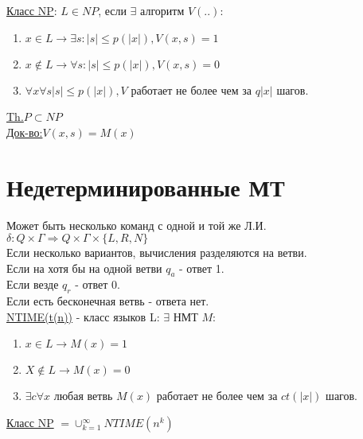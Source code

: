 \documentclass{article}
\begin{document}
	
	\underline{Класс NP}: $L\in NP$, если $\exists$ алгоритм $V(..):$
	\begin{enumerate}
		\item $x\in L \to \exists s:|s| \le p(|x|), V(x,s)=1$
		\item $x\not\in L \to \forall s:|s| \le p(|x|), V(x,s)=0$
		\item $\forall x \forall s |s| \le p(|x|), V$ работает не более чем за $q{|x|}$ шагов.
	\end{enumerate}
	\underline{Th.}$P \subset NP$\\
	\underline{Док-во:}$V(x,s)=M(x)$\\
	
	
	\section{Недетерминированные МТ}
	Может быть несколько команд с одной и той же Л.И.$\delta:Q\times\Gamma \Rightarrow Q\times\Gamma\times\{L,R,N\}$\\
	Если несколько вариантов, вычисления разделяются на ветви.\\
	Если на хотя бы на одной ветви $q_a$ - ответ 1.\\
	Если везде $q_r$ - ответ 0.\\
	Если есть бесконечная ветвь - ответа нет.\\
	
	\underline{NTIME(t(n))} - класс языков L: $\exists$ НМТ $M$:
	 \begin{enumerate}
	 	\item $x \in L \to M(x)=1$
		\item $X \not\in L \to M(x)=0$
		\item $\exists c \forall x$ любая ветвь $M(x)$ работает не более чем за $ct(|x|)$ шагов.
	 \end{enumerate}
	
	\underline{Класс NP} $ = \cup_{k=1}^{\infty}NTIME(n^k)$
\end{document}
